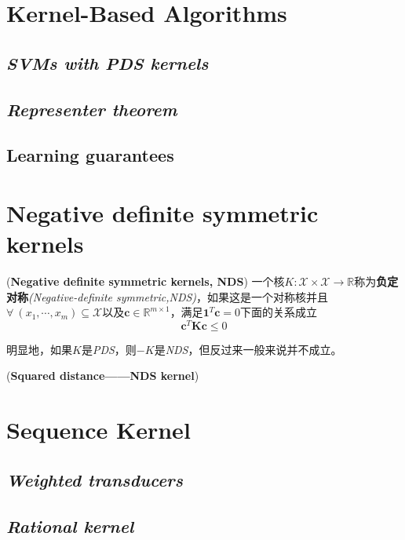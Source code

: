 \section{Kernel-Based Algorithms}

\subsection*{\textsl{SVMs with PDS kernels}}

\subsection*{\textsl{Representer theorem}}

\subsection*{Learning guarantees}

\section{Negative definite symmetric kernels}

\begin{define}
    (\textbf{Negative definite symmetric kernels, NDS}) 一个核$K:\mathcal{X}\times \mathcal{X}\rightarrow \mathbb{R}$称为\textbf{负定对称}\textsl{(Negative-definite symmetric,NDS)}，如果这是一个对称核并且$\forall\ (x_1,\cdots,x_m)\subseteq \mathcal{X}$以及$\mathbf{c}\in \mathbb{R}^{m\times 1}$，满足$\mathbf{1}^T\mathbf{c}=0$下面的关系成立
    \begin{equation}
        \mathbf{c}^T\mathbf{K}\mathbf{c}\leqslant 0
    \end{equation}
\end{define}

明显地，如果$K$是\textsl{PDS}，则$-K$是\textsl{NDS}，但反过来一般来说并不成立。

\begin{example}
    (\textbf{Squared distance——NDS kernel})\hspace{0.5em} 
\end{example}

\section{Sequence Kernel}

\subsection*{\textsl{Weighted transducers}}

\subsection*{\textsl{Rational kernel}}